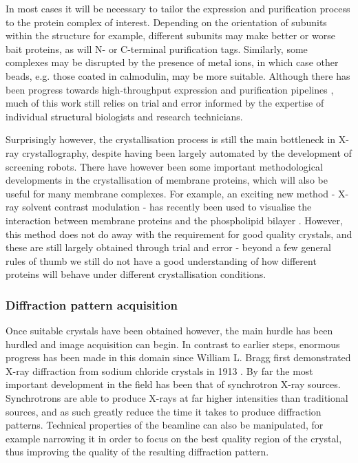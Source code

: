 \documentclass[a4paper,11pt,twoside,openright]{scrbook}
\begin{document}
In most cases it will be necessary to tailor the expression and purification process to the protein complex of interest. Depending on the orientation of subunits within the structure for example, different subunits may make better or worse bait proteins, as will N- or C-terminal purification tags. Similarly, some complexes may be disrupted by the presence of metal ions, in which case other beads, e.g. those coated in calmodulin, may be more suitable. Although there has been progress towards high-throughput expression and purification pipelines \cite{Jia2016}, much of this work still relies on trial and error informed by the expertise of individual structural biologists and research technicians.

Surprisingly however, the crystallisation process is still the main bottleneck in X-ray crystallography, despite having been largely automated by the development of screening robots. There have however been some important methodological developments in the crystallisation of membrane proteins, which will also be useful for many membrane complexes. For example, an exciting new method - X-ray solvent contrast modulation - has recently been used to visualise the interaction between membrane proteins and the phospholipid bilayer \cite{Norimatsu2017}. However, this method does not do away with the requirement for good quality crystals, and these are still largely obtained through trial and error - beyond a few general rules of thumb we still do not have a good understanding of how different proteins will behave under different crystallisation conditions.

\subsubsection{Diffraction pattern acquisition}
Once suitable crystals have been obtained however, the main hurdle has been hurdled and image acquisition can begin. In contrast to earlier steps, enormous progress has been made in this domain since William L. Bragg first demonstrated X-ray diffraction from sodium chloride crystals in 1913 \cite{Bragg1913}. By far the most important development in the field has been that of synchrotron X-ray sources. Synchrotrons are able to produce X-rays at far higher intensities than traditional sources, and as such greatly reduce the time it takes to produce diffraction patterns. Technical properties of the beamline can also be manipulated, for example narrowing it in order to focus on the best quality region of the crystal, thus improving the quality of the resulting diffraction pattern.
\end{document}

